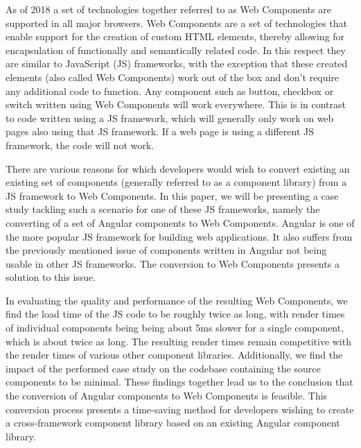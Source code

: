 As of 2018 a set of technologies together referred to as Web Components are supported in all major browsers. Web Components are a set of technologies that enable support for the creation of custom HTML elements, thereby allowing for encapsulation of functionally and semantically related code. In this respect they are similar to JavaScript (JS) frameworks, with the exception that these created elements (also called Web Components) work out of the box and don't require any additional code to function. Any component such as button, checkbox or switch written using Web Components will work everywhere. This is in contrast to code written using a JS framework, which will generally only work on web pages also using that JS framework. If a web page is using a different JS framework, the code will not work. 

There are various reasons for which developers would wish to convert existing an existing set of components (generally referred to as a component library) from a JS framework to Web Components. In this paper, we will be presenting a case study tackling such a scenario for one of these JS frameworks, namely the converting of a set of Angular components to Web Components. Angular is one of the more popular JS framework for building web applications. It also suffers from the previously mentioned issue of components written in Angular not being usable in other JS frameworks. The conversion to Web Components presents a solution to this issue.

In evaluating the quality and performance of the resulting Web Components, we find the load time of the JS code to be roughly twice as long, with render times of individual components being being about 5ms slower for a single component, which is about twice as long. The resulting render times remain competitive with the render times of various other component libraries. Additionally, we find the impact of the performed case study on the codebase containing the source components to be minimal. These findings together lead us to the conclusion that the conversion of Angular components to Web Components is feasible. This conversion process presents a time-saving method for developers wishing to create a cross-framework component library based on an existing Angular component library.